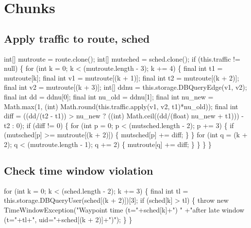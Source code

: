 \section{Chunks}

\subsection{Apply traffic to route, sched}
\nwenddocs{}\endmoddef{}
int[] mutroute = route.clone();
int[] mutsched = sched.clone();
if (this.traffic != null) \{
  for (int k = 0; k < (mutroute.length - 3); k += 4) \{
    final int t1 = mutroute[k];
    final int v1 = mutroute[(k + 1)];
    final int t2 = mutroute[(k + 2)];
    final int v2 = mutroute[(k + 3)];
    int[] ddnu = this.storage.DBQueryEdge(v1, v2);
    final int dd = ddnu[0];
    final int nu_old = ddnu[1];
    final int nu_new = Math.max(1, (int) Math.round(this.traffic.apply(v1, v2, t1)*nu_old));
    final int diff = ((dd/(t2 - t1)) > nu_new
        ? ((int) Math.ceil((dd/(float) nu_new + t1))) - t2
        : 0);
    if (diff != 0) \{
      for (int p = 0; p < (mutsched.length - 2); p += 3) \{
        if (mutsched[p] >= mutroute[(k + 2)]) \{
          mutsched[p] += diff;
        \}
      \}
      for (int q = (k + 2); q < (mutroute.length - 1); q += 2) \{
        mutroute[q] += diff;
      \}
    \}
  \}
\}
\nwendcode{}\nwdocspar

\subsection{Check time window violation}
\nwenddocs{}\endmoddef{}
for (int k = 0; k < (sched.length - 2); k += 3) \{
  final int tl = this.storage.DBQueryUser(sched[(k + 2)])[3];
  if (sched[k] > tl) \{
    throw new TimeWindowException("Waypoint time (t="+sched[k]+") "
        +"after late window (t="+tl+", uid="+sched[(k + 2)]+")");
  \}
\}
\nwendcode{}\nwdocspar

